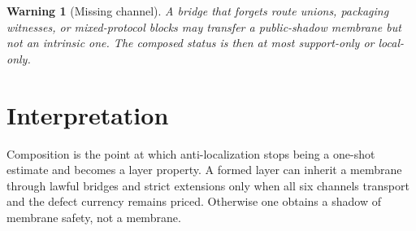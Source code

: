 \documentclass[11pt]{article}
\newtheorem{warning}{Warning}
\begin{document}
\begin{warning}[Missing channel]
A bridge that forgets route unions, packaging witnesses, or mixed-protocol blocks may transfer a public-shadow membrane but not an intrinsic one.  The composed status is then at most support-only or local-only.
\end{warning}

\section{Interpretation}
Composition is the point at which anti-localization stops being a one-shot estimate and becomes a layer property.  A formed layer can inherit a membrane through lawful bridges and strict extensions only when all six channels transport and the defect currency remains priced.  Otherwise one obtains a shadow of membrane safety, not a membrane.
\end{document}
